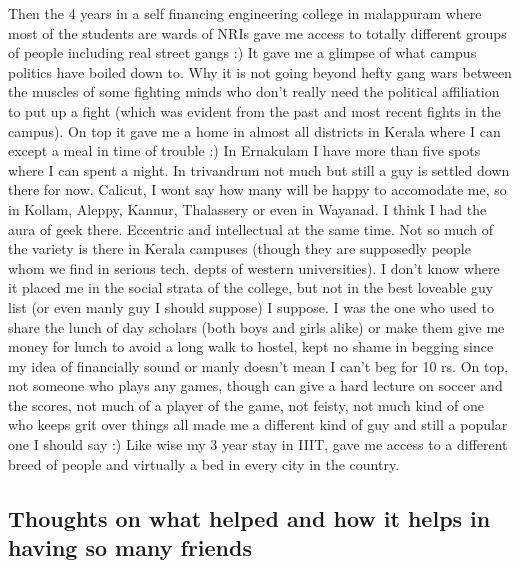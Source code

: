 Then the 4 years in a self financing engineering college in malappuram where most of the students 
are wards of NRIs gave me access to totally different groups of people including real street gangs :) 
It gave me a glimpse of what campus politics have boiled down to. Why it is not going beyond hefty 
gang wars between the muscles of some fighting minds who don't really need the political affiliation 
to put up a fight (which was evident from the past and most recent fights in the campus). On top 
it gave me a home in almost all districts in Kerala where I can except a meal in time of trouble :) 
In Ernakulam I have more than five spots where I can spent a night. In trivandrum not much but still 
a guy is settled down there for now. Calicut, I wont say how many will be happy to accomodate me, 
so in Kollam, Aleppy, Kannur, Thalassery or even in Wayanad. I think I had the aura of geek there.
Eccentric and intellectual at the same time. Not so much of the variety is there in Kerala campuses
(though they are supposedly people whom we find in serious tech. depts of western universities). I
don't know where it placed me in the social strata of the college, but not in the best loveable guy 
list (or even manly guy I should suppose) I suppose. I was the one who used to share the lunch of day
scholars (both boys and girls alike) or make them give me money for lunch to avoid a long walk to
hostel, kept no shame in begging since my idea of financially sound or manly doesn't mean I can't 
beg for 10 rs. On top, not someone who plays any games, though can give a hard lecture on soccer 
and the scores, not much of a player of the game, not feisty, not much kind of one who keeps grit 
over things all made me a different kind of guy and still a popular one I should say :) Like wise 
my 3 year stay in IIIT, gave me access to a different breed of people and virtually a bed in every 
city in the country.

\subsection*{Thoughts on what helped and how it helps in having so many friends}

